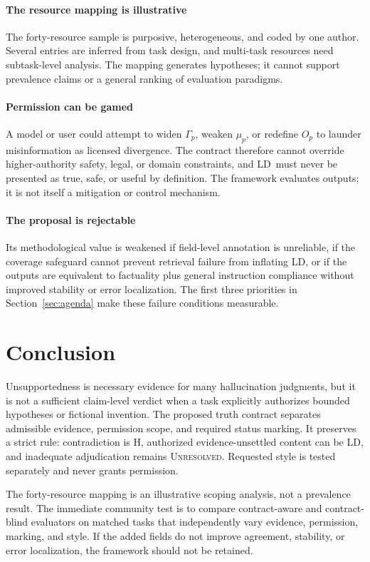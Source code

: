 \documentclass{clv2025}
\newcommand{\LD}{\textsc{LD}}
\newcommand{\Hall}{\textsc{H}}
\newcommand{\UNR}{\textsc{Unresolved}}
\begin{document}
\paragraph{The resource mapping is illustrative}
The forty-resource sample is purposive, heterogeneous, and coded by one
author.
Several entries are inferred from task design, and multi-task resources
need subtask-level analysis.
The mapping generates hypotheses; it cannot support prevalence claims or a
general ranking of evaluation paradigms.

\paragraph{Permission can be gamed}
A model or user could attempt to widen $\Gamma_p$, weaken $\mu_p$, or
redefine $O_p$ to launder misinformation as licensed divergence.
The contract therefore cannot override higher-authority safety, legal, or
domain constraints, and \LD\ must never be presented as true, safe, or
useful by definition.
The framework evaluates outputs; it is not itself a mitigation or control
mechanism.

\paragraph{The proposal is rejectable}
Its methodological value is weakened if field-level annotation is
unreliable, if the coverage safeguard cannot prevent retrieval failure from
inflating \LD, or if the outputs are equivalent to factuality plus general
instruction compliance without improved stability or error localization.
The first three priorities in Section~\ref{sec:agenda} make these failure
conditions measurable.

\section{Conclusion}\label{sec:conclusion}

Unsupportedness is necessary evidence for many hallucination judgments,
but it is not a sufficient claim-level verdict when a task explicitly
authorizes bounded hypotheses or fictional invention.
The proposed truth contract separates admissible evidence, permission
scope, and required status marking.
It preserves a strict rule: contradiction is \Hall, authorized
evidence-unsettled content can be \LD, and inadequate adjudication remains
\UNR.
Requested style is tested separately and never grants permission.

The forty-resource mapping is an illustrative scoping analysis, not a
prevalence result.
The immediate community test is to compare contract-aware and
contract-blind evaluators on matched tasks that independently vary
evidence, permission, marking, and style.
If the added fields do not improve agreement, stability, or error
localization, the framework should not be retained.
\end{document}
